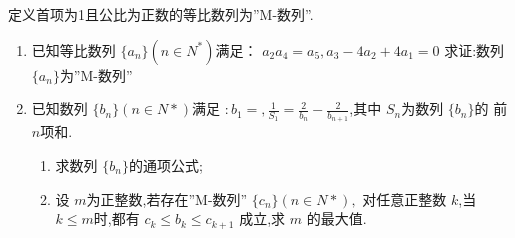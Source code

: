 \documentclass[class=ctexart,crop=false]{standalone}
\begin{document}
    定义首项为1且公比为正数的等比数列为”M-数列”.
    \begin{enumerate}[label=(\arabic*)]
        \item 已知等比数列 $\{a_n\}(n\in N^*) $满足： $a_2a_4=a_5,a_3-4a_2+4a_1=0$
        求证:数列 $\{a_n\} $为”M-数列”
        \item 已知数列 $\{b_n\}(n\in N*) $满足 $:b_1=,\frac{1}{S_1}=
        \frac{2}{b_n}-\frac{2}{b_{n+1}}$,其中 $S_n $为数列 $\{b_n\} $的
        前 $n$项和.
        \begin{enumerate}[label=\protect\circled{\arabic*}]
            \item 求数列 $\{b_n\} $的通项公式;
            \item 设 $m$为正整数,若存在”M-数列” $\{c_n\}(n\in N*), $
            对任意正整数 $k$,当 $k\leqslant m$时,都有 $c_k\leqslant b_k \leqslant c_{k+1}$
            成立,求 $m$ 的最大值.
        \end{enumerate}
    \end{enumerate}
\end{document}
